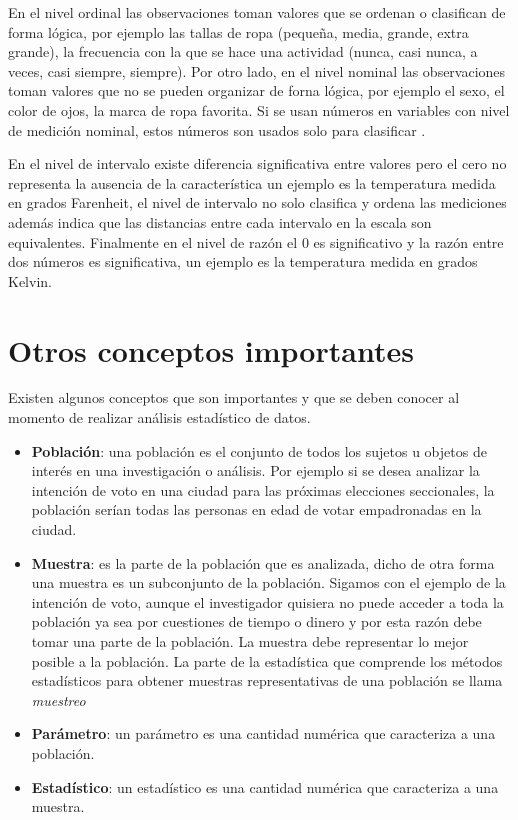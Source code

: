 \documentclass[
]{krantz}
\providecommand{\tightlist}{%
  \setlength{\itemsep}{0pt}\setlength{\parskip}{0pt}}
\begin{document}
En el nivel ordinal las observaciones toman valores que se ordenan o clasifican de forma lógica, por ejemplo las tallas de ropa (pequeña, media, grande, extra grande), la frecuencia con la que se hace una actividad (nunca, casi nunca, a veces, casi siempre, siempre). Por otro lado, en el nivel nominal las observaciones toman valores que no se pueden organizar de forna lógica, por ejemplo el sexo, el color de ojos, la marca de ropa favorita. Si se usan números en variables con nivel de medición nominal, estos números son usados solo para clasificar \citep{barrow2006, cleff2013}.

En el nivel de intervalo existe diferencia significativa entre valores pero el cero no representa la ausencia de la característica un ejemplo es la temperatura medida en grados Farenheit, el nivel de intervalo no solo clasifica y ordena las mediciones además indica que las distancias entre cada intervalo en la escala son equivalentes. Finalmente en el nivel de razón el 0 es significativo y la razón entre dos números es significativa, un ejemplo es la temperatura medida en grados Kelvin.

\hypertarget{otros-conceptos-importantes}{%
\section{Otros conceptos importantes}\label{otros-conceptos-importantes}}

Existen algunos conceptos que son importantes y que se deben conocer al momento de realizar análisis estadístico de datos.

\begin{itemize}
\tightlist
\item
  \textbf{Población}: una población es el conjunto de todos los sujetos u objetos de interés en una investigación o análisis. Por ejemplo si se desea analizar la intención de voto en una ciudad para las próximas elecciones seccionales, la población serían todas las personas en edad de votar empadronadas en la ciudad.
\item
  \textbf{Muestra}: es la parte de la población que es analizada, dicho de otra forma una muestra es un subconjunto de la población. Sigamos con el ejemplo de la intención de voto, aunque el investigador quisiera no puede acceder a toda la población ya sea por cuestiones de tiempo o dinero y por esta razón debe tomar una parte de la población. La muestra debe representar lo mejor posible a la población. La parte de la estadística que comprende los métodos estadísticos para obtener muestras representativas de una población se llama \emph{muestreo}
\item
  \textbf{Parámetro}: un parámetro es una cantidad numérica que caracteriza a una población.
\item
  \textbf{Estadístico}: un estadístico es una cantidad numérica que caracteriza a una muestra.
\end{itemize}
\end{document}
